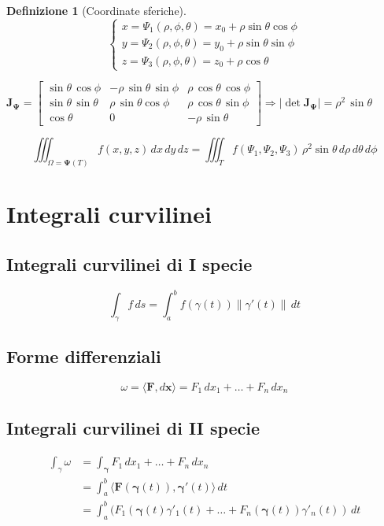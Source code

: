 \documentclass[a4paper,12pt]{report}
\theoremstyle{mystyle}
\newtheorem{definition}[theorem]{Definizione}
\begin{document}
\begin{definition}[Coordinate sferiche]
\[
    \begin{cases}
        x = \Psi_1 (\rho,\phi,\theta) = x_0 + \rho \sin \theta \cos \phi \\
        y = \Psi_2 (\rho,\phi,\theta) = y_0 + \rho \sin\theta \sin\phi   \\
        z = \Psi_3 (\rho,\phi,\theta) = z_0 + \rho \cos \theta
    \end{cases}
\]

\(
    \mathbf{J_\Psi} =
    \begin{bmatrix}
        \sin \theta \, \cos \phi   & - \rho \, \sin \theta \, \sin \phi & \rho \, \cos \theta \, \cos \phi \\
        \sin \theta \, \sin \theta & \rho \, \sin \theta \cos \phi      & \rho \, \cos \theta \, \sin \phi \\
        \cos \theta                & 0                                  & - \rho \, \sin \theta
    \end{bmatrix}
    \Rightarrow \lvert \det \mathbf{J_\Psi} \rvert = \rho ^2 \, \sin \theta
\)

\[
    \iiint_{\Omega = \mathbf{\Psi}(T)} f(x,y,z) \, dx \, dy \, dz = \iiint_T f(\Psi_1, \Psi_2 , \Psi_3) \, \rho^2 \sin \theta \, d\rho \, d\theta \, d\phi
\]
\end{definition}

\section{Integrali curvilinei}
\subsection{Integrali curvilinei di I specie}
\[
    \int_\gamma f \,ds = \int_a^b f(\gamma (t)) \lVert \gamma' (t) \rVert \, dt
\]
\subsection{Forme differenziali}
\[
    \omega = \langle \mathbf{F},d  \mathbf{x} \rangle = F_1 \, dx_1 + \ldots + F_n \, dx_n
\]
\subsection{Integrali curvilinei di II specie}
\[
    \begin{aligned}
        \int_\gamma \omega 
        &= \int_{\mathbf{\gamma}} F_1 \,dx_1 + \ldots + F_n \, dx_n  \\
        &= \int_a^b \langle \mathbf{F}(\mathbf{\gamma}(t)), \mathbf{\gamma}'(t) \rangle \, dt  \\
        &= \int_a^b (F_1(\mathbf{\gamma}(t)\gamma'_1(t)+ \ldots + F_n(\mathbf{\gamma}(t))\gamma'_n (t))\, dt
    \end{aligned}
\]
\end{document}
